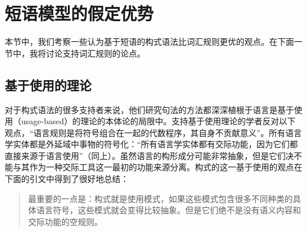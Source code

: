 \section{短语模型的假定优势}
\label{Abschnitt-Stoepselei}
%

    本节中，我们考察一些认为基于短语的构式语法比词汇规则更优的观点。在下面一节中，我将讨论支持词汇规则的论点。

\subsection{基于使用的理论}\label{usage-based-sec}
    对于构式语法的很多支持者来说，他们研究句法的方法都深深植根于语言是基于使用（usage-based）的理论\citep{Langacker87a-u, Goldberg95a,Croft2001a, Tomasello2003a}的本体论的局限中。支持基于使用理论的学者反对以下观点，“语言规则是将符号组合在一起的代数程序，其自身不贡献意义”\citep[]{Tomasello2003a}。所有语言学实体都是外延域中事物的符号化：“所有语言学实体都有交际功能，因为它们都直接来源于语言使用”（同上）。虽然语言的构形成分可能非常抽象，但是它们决不能与其作为一种交际工具这一最初的功能来源分离。构式的这一基于使用的观点在下面的引文中得到了很好地总结：
\begin{quotation}
最重要的一点是：构式就是使用模式，如果这些模式包含很多不同种类的具体语言符号，这些模式就会变得比较抽象。但是它们绝不是没有语义内容和交际功能的空规则。 \citep[]{Tomasello2003a}
\end{quotation}

